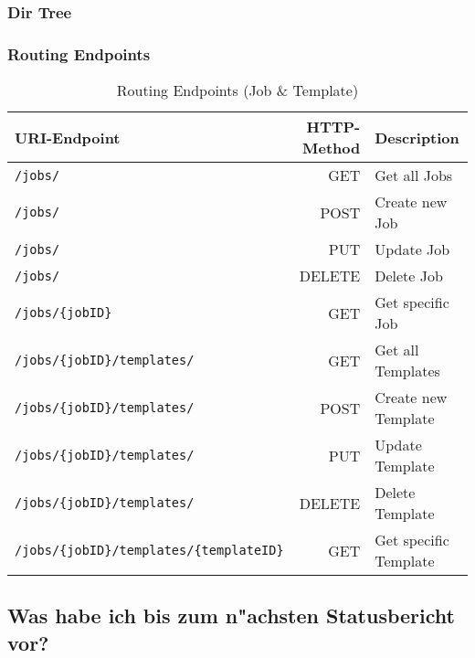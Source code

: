\documentclass[12pt]{article}
\begin{document}
\subsubsection{Dir Tree}

\renewcommand*\DTstylecomment{\rmfamily\color{red}\textsc}
\newpage
\subsubsection{Routing Endpoints}
\smallbreak
\begin{table}[h]
\begin{tabular}{||l|r|l||}
	\hline
 \textbf{URI-Endpoint}  & \textbf{HTTP-Method} & \textbf{Description} \\ \hline\hline
 \texttt{/jobs/} & GET & Get all Jobs \\ \hline
 \texttt{/jobs/} & POST & Create new Job \\ \hline
 \texttt{/jobs/} & PUT & Update Job \\ \hline
 \texttt{/jobs/} & DELETE & Delete Job \\ \hline
 \texttt{/jobs/\{jobID\}} & GET & Get specific Job \\ \hline \hline
 \texttt{/jobs/\{jobID\}/templates/} & GET & Get all Templates \\ \hline
 \texttt{/jobs/\{jobID\}/templates/} & POST & Create new Template \\ \hline
 \texttt{/jobs/\{jobID\}/templates/} & PUT & Update Template \\ \hline
 \texttt{/jobs/\{jobID\}/templates/} & DELETE & Delete Template \\ \hline
 \texttt{/jobs/\{jobID\}/templates/\{templateID\}} & GET & Get specific Template \\ \hline
\end{tabular}
\caption{Routing Endpoints (Job \& Template)}
\label{tab:meinetabelle}
\end{table}




\subsection{Was habe ich bis zum n"achsten Statusbericht vor?}
\end{document}
